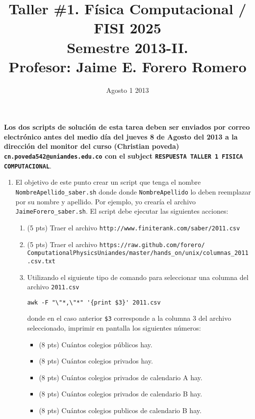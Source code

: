 \documentclass{article}
\title{Taller \#1. F\'isica Computacional / FISI 2025 \\Semestre 2013-II. \\ Profesor: Jaime E. Forero Romero}
\date{Agosto 1 2013}
\begin{document}
\maketitle

{\bf Los dos scripts de soluci\'on de esta tarea deben ser enviados por correo electr\'onico antes del medio d\'ia del jueves 8 de Agosto del 2013 a la direcci\'on del monitor del curso (Christian poveda) {\texttt{cn.poveda542@uniandes.edu.co}} con el subject \verb"RESPUESTA TALLER 1 FISICA COMPUTACIONAL"}.

\begin{enumerate}

\item
El objetivo de este punto crear un script que tenga el nombre \verb"NombreApellido_saber.sh" donde donde \verb"NombreApellido" lo deben reemplazar por su nombre y apellido. Por ejemplo, yo crear\'ia el archivo \verb"JaimeForero_saber.sh". El script debe ejecutar las siguientes acciones:

\begin{enumerate}
\item  (5 pts)
Traer el archivo  \verb"http://www.finiterank.com/saber/2011.csv"
\item (5 pts)
Traer el archivo \verb"https://raw.github.com/forero/"\newline
\verb"ComputationalPhysicsUniandes/master/hands_on/unix/columnas_2011.csv.txt"
\item

  Utilizando el siguiente tipo de comando para seleccionar una columna del archivo \verb"2011.csv"
\begin{verbatim}
awk -F "\"*,\"*" '{print $3}' 2011.csv
\end{verbatim}
donde en el caso anterior \verb"$3" corresponde a la columna 3 del archivo seleccionado, imprimir en pantalla los siguientes n\'umeros:
\begin{itemize}
\item (8 pts) Cu\'antos colegios p\'ublicos hay.
\item (8 pts) Cu\'antos colegios privados hay.
\item (8 pts) Cu\'antos colegios privados de calendario A hay.
\item (8 pts) Cu\'antos colegios privados de calendario B hay.
\item (8 pts) Cu\'antos colegios publicos de calendario B hay.
\end{itemize}



\end{enumerate}
\end{enumerate}
\end{document}
